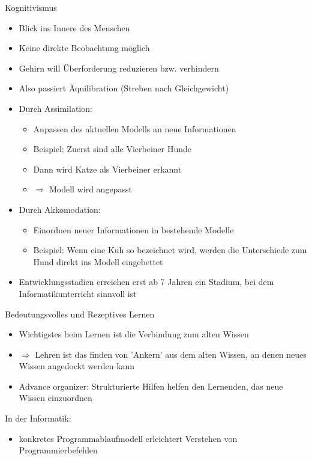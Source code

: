 \documentclass{article}
\begin{document}
\begin{block}{Kognitivismus}
    \begin{itemize}
        \item Blick ins Innere des Menschen
        \item Keine direkte Beobachtung möglich
        \item Gehirn will Überforderung reduzieren bzw. verhindern
        \item Also passiert Äquilibration (Streben nach Gleichgewicht)
        \item Durch Assimilation:
        \begin{itemize}
            \item Anpassen des aktuellen Modells an neue Informationen
            \item Beispiel: Zuerst sind alle Vierbeiner Hunde
            \item Dann wird Katze als Vierbeiner erkannt
            \item $\Rightarrow$ Modell wird angepasst
        \end{itemize}
        \item Durch Akkomodation:
        \begin{itemize}
            \item Einordnen neuer Informationen in bestehende Modelle
            \item Beispiel: Wenn eine Kuh so bezeichnet wird, werden die Unterschiede zum Hund direkt ins Modell eingebettet
        \end{itemize}
        \item Entwicklungsstadien erreichen erst ab 7 Jahren ein Stadium, bei dem Informatikunterricht sinnvoll ist
    \end{itemize}
\end{block}

\begin{block}{Bedeutungsvolles und Rezeptives Lernen}
    \begin{itemize}
        \item Wichtigstes beim Lernen ist die Verbindung zum alten Wissen
        \item $\Rightarrow$ Lehren ist das finden von 'Ankern' aus dem alten Wissen, an denen neues Wissen angedockt werden kann
        \item Advance organizer: Strukturierte Hilfen helfen den Lernenden, das neue Wissen einzuordnen
    \end{itemize}
    In der Informatik:
    \begin{itemize}
        \item konkretes Programmablaufmodell erleichtert Verstehen von Programmierbefehlen
    \end{itemize}
\end{block}
\end{document}
